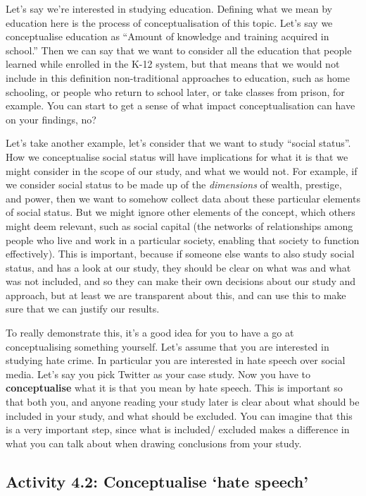 \documentclass[
]{book}
\begin{document}
Let's say we're interested in studying education. Defining what we mean by education here is the process of conceptualisation of this topic. Let's say we conceptualise education as ``Amount of knowledge and training acquired in school.'' Then we can say that we want to consider all the education that people learned while enrolled in the K-12 system, but that means that we would not include in this definition non-traditional approaches to education, such as home schooling, or people who return to school later, or take classes from prison, for example. You can start to get a sense of what impact conceptualisation can have on your findings, no?

Let's take another example, let's consider that we want to study ``social status''. How we conceptualise social status will have implications for what it is that we might consider in the scope of our study, and what we would not. For example, if we consider social status to be made up of the \emph{dimensions} of wealth, prestige, and power, then we want to somehow collect data about these particular elements of social status. But we might ignore other elements of the concept, which others might deem relevant, such as social capital (the networks of relationships among people who live and work in a particular society, enabling that society to function effectively). This is important, because if someone else wants to also study social status, and has a look at our study, they should be clear on what was and what was not included, and so they can make their own decisions about our study and approach, but at least we are transparent about this, and can use this to make sure that we can justify our results.

To really demonstrate this, it's a good idea for you to have a go at conceptualising something yourself. Let's assume that you are interested in studying hate crime. In particular you are interested in hate speech over social media. Let's say you pick Twitter as your case study. Now you have to \textbf{conceptualise} what it is that you mean by hate speech. This is important so that both you, and anyone reading your study later is clear about what should be included in your study, and what should be excluded. You can imagine that this is a very important step, since what is included/ excluded makes a difference in what you can talk about when drawing conclusions from your study.

\hypertarget{activity-4.2-conceptualise-hate-speech}{%
\subsection{Activity 4.2: Conceptualise `hate speech'}\label{activity-4.2-conceptualise-hate-speech}}
\end{document}
